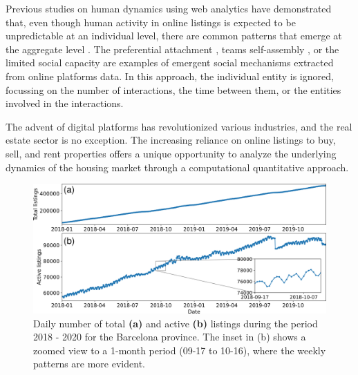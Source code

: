 Previous studies on human dynamics using web analytics have demonstrated that, even though human activity in online listings is expected to be unpredictable at an individual level, there are common patterns that emerge at the aggregate level \cite{Lazer2009CompSocSci}. The preferential attachment \cite{barabasi1999emergence,goncalves-2008}, teams self-assembly \cite{guimera-2005}, or the limited social capacity \cite{goncalves-2011,dunbar-2012} are examples of emergent social mechanisms extracted from online platforms data. In this approach, the individual entity is ignored, focussing on the number of interactions, the time between them, or the entities involved in the interactions.

The advent of digital platforms has revolutionized various industries, and the real estate sector is no exception. The increasing reliance on online listings to buy, sell, and rent properties offers a unique opportunity to analyze the underlying dynamics of the housing market through a computational quantitative approach. 


\begin{figure}
    \vspace{0.2 cm}
    \centering
    \includegraphics[width =\textwidth]{Figs/Idealista_dynamics/adds_evo.pdf}
	\caption[Active listings' evolution.]{\label{fig:active_adds} Daily number of total \textbf{(a)} and active \textbf{(b)} listings during the period 2018 - 2020 for the Barcelona province. The inset in (b) shows a zoomed view to a 1-month period (09-17 to 10-16), where the weekly patterns are more evident.}
\end{figure}

